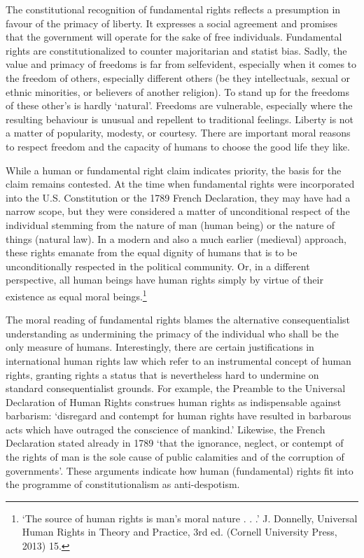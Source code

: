 \begin{multicols}{2}
\noi
The constitutional recognition of fundamental rights reflects a presumption in favour of the
primacy of liberty. It expresses a social agreement and promises that the government will
operate for the sake of free individuals. Fundamental rights are constitutionalized to counter
majoritarian and statist bias. Sadly, the value and primacy of freedoms is far from selfevident, especially when it comes to the freedom of others, especially different others (be
they intellectuals, sexual or ethnic minorities, or believers of another religion). To stand up
for the freedoms of these other’s is hardly ‘natural’. Freedoms are vulnerable, especially
where the resulting behaviour is unusual and repellent to traditional feelings. Liberty is not a
matter of popularity, modesty, or courtesy. There are important moral reasons to respect
freedom and the capacity of humans to choose the good life they like. 

\vspace{-.1cm}

\noi
While a human or fundamental right claim indicates priority, the basis for the claim remains
contested. At the time when fundamental rights were incorporated into the U.S. Constitution
or the 1789 French Declaration, they may have had a narrow scope, but they were considered
a matter of unconditional respect of the individual stemming from the nature of man (human being) or the nature of things (natural law). In a modern and also a much earlier (medieval)
approach, these rights emanate from the equal dignity of humans that is to be unconditionally
respected in the political community. Or, in a different perspective, all human beings have
human rights simply by virtue of their existence as equal moral beings.\footnote{‘The source of human rights is man’s moral nature . . .’ J. Donnelly, Universal Human Rights in Theory and
Practice, 3rd ed. (Cornell University Press, 2013) 15.}

\noi
The moral reading of fundamental rights blames the alternative consequentialist
understanding as undermining the primacy of the individual who shall be the only measure of
humans. Interestingly, there are certain justifications in international human rights law which
refer to an instrumental concept of human rights, granting rights a status that is nevertheless
hard to undermine on standard consequentialist grounds. For example, the Preamble to the
Universal Declaration of Human Rights construes human rights as indispensable against
barbarism: ‘disregard and contempt for human rights have resulted in barbarous acts which
have outraged the conscience of mankind.’ Likewise, the French Declaration stated already in
1789 ‘that the ignorance, neglect, or contempt of the rights of man is the sole cause of public
calamities and of the corruption of governments’. These arguments indicate how human
(fundamental) rights fit into the programme of constitutionalism as anti-despotism.



\end{multicols}
